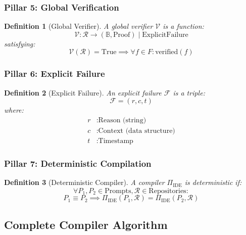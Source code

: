 \documentclass[12pt]{article}
\newtheorem{definition}{Definition}
\begin{document}
\subsubsection{Pillar 5: Global Verification}

\begin{definition}[Global Verifier]
A global verifier $\mathcal{V}$ is a function:
\[
\mathcal{V}: \mathcal{R} \to (\mathbb{B}, \text{Proof}) \mid \text{ExplicitFailure}
\]
satisfying:
\[
\mathcal{V}(\mathcal{R}) = \text{True} \implies \forall f \in F: \text{verified}(f)
\]
\end{definition}

\subsubsection{Pillar 6: Explicit Failure}

\begin{definition}[Explicit Failure]
An explicit failure $\mathcal{F}$ is a triple:
\[
\mathcal{F} = (r, c, t)
\]
where:
\begin{align*}
r & : \text{Reason (string)} \\
c & : \text{Context (data structure)} \\
t & : \text{Timestamp}
\end{align*}
\end{definition}

\subsubsection{Pillar 7: Deterministic Compilation}

\begin{definition}[Deterministic Compiler]
A compiler $\Pi_{\text{IDE}}$ is deterministic if:
\[
\forall P_1, P_2 \in \text{Prompts}, \mathcal{R} \in \text{Repositories}:
\]
\[
P_1 \equiv P_2 \implies \Pi_{\text{IDE}}(P_1, \mathcal{R}) = \Pi_{\text{IDE}}(P_2, \mathcal{R})
\]
\end{definition}

\subsection{Complete Compiler Algorithm}
\end{document}

